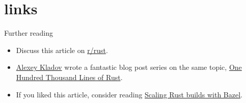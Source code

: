 \documentclass{article}
\begin{document}
\section{links}{Further reading}

\begin{itemize}
  \item 
    Discuss this article on \href{https://www.reddit.com/r/rust/comments/s818q3/blog_post_rust_at_scale_packages_crates_and/}{r/rust}.
  \item 
    \href{https://github.com/matklad}{Alexey Kladov} wrote a fantastic blog post series on the same topic, \href{https://matklad.github.io/2021/09/05/Rust100k.html}{One Hundred Thousand Lines of Rust}.
  \item 
    If you liked this article, consider reading \href{/posts/17-scaling-rust-builds-with-bazel.html}{Scaling Rust builds with Bazel}.
\end{itemize}
\end{document}
